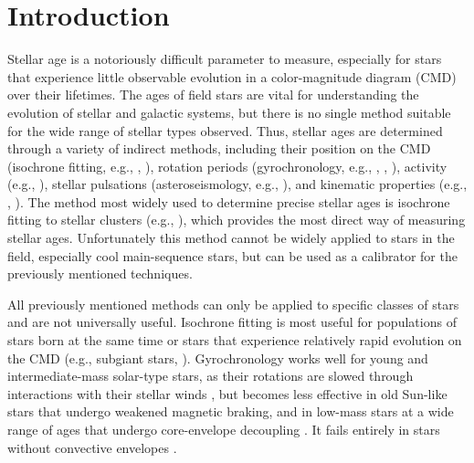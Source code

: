 \documentclass[twocolumn]{aastex631}
\begin{document}
\section{Introduction}\label{sec:intro}
Stellar age is a notoriously difficult parameter to measure, especially for stars that experience little observable evolution in a color-magnitude diagram (CMD) over their lifetimes. The ages of field stars are vital for understanding the evolution of stellar and galactic systems, but there is no single method suitable for the wide range of stellar types observed. Thus, stellar ages are determined through a variety of indirect methods, including their position on the CMD (isochrone fitting, e.g., \citealt{2018ApJ...866...99B}, \citealt{2022Natur.603..599X}), rotation periods (gyrochronology, e.g., \citealt{2007ApJ...669.1167B}, \citealt{2019ApJ...871...39M}, \citealt{2020ApJ...888...43C}), activity (e.g., \citealt{2008ApJ...687.1264M}), stellar pulsations (asteroseismology, e.g., \citealt{2014ApJS..210....1C}), and kinematic properties (e.g., \citealt{2009A&A...501..941H, 2019ApJ...886..100C}, \citealt{2021AJ....161..189L}). The method most widely used to determine precise stellar ages is isochrone fitting to stellar clusters (e.g., \citealt{2018AJ....156..165C}), which provides the most direct way of measuring stellar ages. Unfortunately this method cannot be widely applied to stars in the field, especially cool main-sequence stars, but can be used as a calibrator for the previously mentioned techniques.

All previously mentioned methods can only be applied to specific classes of stars and are not universally useful. Isochrone fitting is most useful for populations of stars born at the same time or stars that experience relatively rapid evolution on the CMD (e.g., subgiant stars, \citealt{2022Natur.603..599X}). Gyrochronology works well for young and intermediate-mass solar-type stars, as their rotations are slowed through interactions with their stellar winds \citep{1972ApJ...171..565S}, but becomes less effective in old Sun-like stars \citep{2016Natur.529..181V} that undergo weakened magnetic braking, and in low-mass stars at a wide range of ages that undergo core-envelope decoupling \citep{2019ApJ...877..157L, 2020ApJ...904..140C}. It fails entirely in stars without convective envelopes \citep{1967ApJ...150..551K}.
\end{document}
